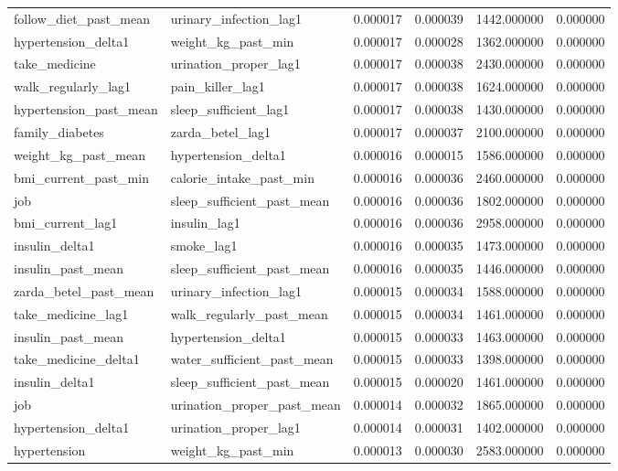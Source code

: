 \begin{longtable}{llrrrr}
follow\_diet\_past\_mean & urinary\_infection\_lag1 & 0.000017 & 0.000039 & 1442.000000 & 0.000000 \\
hypertension\_delta1 & weight\_kg\_past\_min & 0.000017 & 0.000028 & 1362.000000 & 0.000000 \\
take\_medicine & urination\_proper\_lag1 & 0.000017 & 0.000038 & 2430.000000 & 0.000000 \\
walk\_regularly\_lag1 & pain\_killer\_lag1 & 0.000017 & 0.000038 & 1624.000000 & 0.000000 \\
hypertension\_past\_mean & sleep\_sufficient\_lag1 & 0.000017 & 0.000038 & 1430.000000 & 0.000000 \\
family\_diabetes & zarda\_betel\_lag1 & 0.000017 & 0.000037 & 2100.000000 & 0.000000 \\
weight\_kg\_past\_mean & hypertension\_delta1 & 0.000016 & 0.000015 & 1586.000000 & 0.000000 \\
bmi\_current\_past\_min & calorie\_intake\_past\_min & 0.000016 & 0.000036 & 2460.000000 & 0.000000 \\
job & sleep\_sufficient\_past\_mean & 0.000016 & 0.000036 & 1802.000000 & 0.000000 \\
bmi\_current\_lag1 & insulin\_lag1 & 0.000016 & 0.000036 & 2958.000000 & 0.000000 \\
insulin\_delta1 & smoke\_lag1 & 0.000016 & 0.000035 & 1473.000000 & 0.000000 \\
insulin\_past\_mean & sleep\_sufficient\_past\_mean & 0.000016 & 0.000035 & 1446.000000 & 0.000000 \\
zarda\_betel\_past\_mean & urinary\_infection\_lag1 & 0.000015 & 0.000034 & 1588.000000 & 0.000000 \\
take\_medicine\_lag1 & walk\_regularly\_past\_mean & 0.000015 & 0.000034 & 1461.000000 & 0.000000 \\
insulin\_past\_mean & hypertension\_delta1 & 0.000015 & 0.000033 & 1463.000000 & 0.000000 \\
take\_medicine\_delta1 & water\_sufficient\_past\_mean & 0.000015 & 0.000033 & 1398.000000 & 0.000000 \\
insulin\_delta1 & sleep\_sufficient\_past\_mean & 0.000015 & 0.000020 & 1461.000000 & 0.000000 \\
job & urination\_proper\_past\_mean & 0.000014 & 0.000032 & 1865.000000 & 0.000000 \\
hypertension\_delta1 & urination\_proper\_lag1 & 0.000014 & 0.000031 & 1402.000000 & 0.000000 \\
hypertension & weight\_kg\_past\_min & 0.000013 & 0.000030 & 2583.000000 & 0.000000 \\

\end{longtable}
